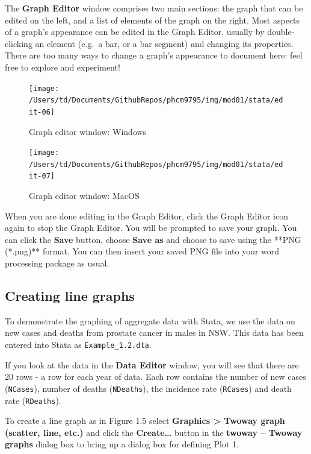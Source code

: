 \documentclass[
]{memoir}
\begin{document}
The \textbf{Graph Editor} window comprises two main sections: the graph that can be edited on the left, and a list of elements of the graph on the right. Most aspects of a graph's appearance can be edited in the Graph Editor, usually by double-clicking an element (e.g.~a bar, or a bar segment) and changing its properties. There are too many ways to change a graph's appearance to document here: feel free to explore and experiment!

\begin{figure}[H]
\texttt{[image: /Users/td/Documents/GithubRepos/phcm9795/img/mod01/stata/edit-06]} \caption{Graph editor window: Windows}\label{fig:unnamed-chunk-46}
\end{figure}

\begin{figure}[H]
\texttt{[image: /Users/td/Documents/GithubRepos/phcm9795/img/mod01/stata/edit-07]} \caption{Graph editor window: MacOS}\label{fig:unnamed-chunk-47}
\end{figure}

When you are done editing in the Graph Editor, click the Graph Editor icon again to stop the Graph Editor. You will be prompted to save your graph. You can click the \textbf{Save} button, choose \textbf{Save as} and choose to save using the **PNG (*.png)** format. You can then insert your saved PNG file into your word processing package as usual.

\hypertarget{creating-line-graphs}{%
\subsection{Creating line graphs}\label{creating-line-graphs}}

To demonstrate the graphing of aggregate data with Stata, we use the data on new cases and deaths from prostate cancer in males in NSW. This data has been entered into Stata as \texttt{Example\_1.2.dta}.

If you look at the data in the \textbf{Data Editor} window, you will see that there are 20 rows - a row for each year of data. Each row contains the number of new cases (\texttt{NCases}), number of deaths (\texttt{NDeaths}), the incidence rate (\texttt{RCases}) and death rate (\texttt{RDeaths}).

To create a line graph as in Figure 1.5 select \textbf{Graphics \textgreater{} Twoway graph (scatter, line, etc.)} and click the \textbf{Create\ldots{}} button in the \textbf{twoway -- Twoway graphs} dialog box to bring up a dialog box for defining Plot 1.
\end{document}
